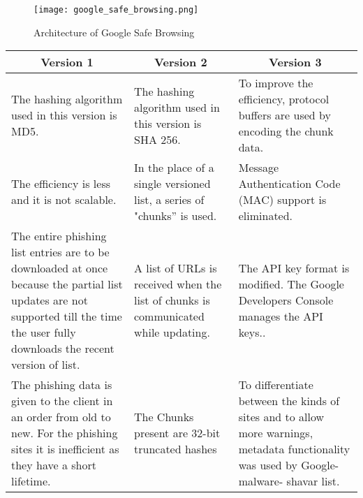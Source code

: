 \begin{figure}[t]
	\centering
	\texttt{[image: google\_safe\_browsing.png]}
	\caption{
		Architecture of Google Safe Browsing
		\citep{Priyam_Sandhu}}
	\label{fig:GSB_ARCHITECTURE}
\end{figure}

\begin{singlespace}
	\begin{table}[!b]
		\begin{center}
			\begin{tabular}{  m{11.9em}  m{11.9em}  m{11.9em}  } \toprule

				\multicolumn{1}{c}{\textbf{Version 1}}  &
				\multicolumn{1}{c}{\textbf{Version 2} } &
				\multicolumn{1}{c}{\textbf{Version 3}}                                                                                              \\ \midrule

				The hashing algorithm used in this
				version is MD5.                         & The hashing algorithm used in this
				version is SHA 256.                     & To improve the efficiency, protocol buffers are
				used by encoding the chunk data.\newline                                                                                            \\

				The efficiency is less and it is not
				scalable. \newline                      & In the place of a single versioned
				list, a series of "chunks” is used.     & Message Authentication Code (MAC) support
				is eliminated.                                                                                                                      \\

				The entire phishing list entries are to be
				downloaded at once because the
				partial list updates are not supported
				till the time the user fully downloads
				the recent version of list. \newline    & A list of URLs is received when the
				list of chunks is communicated
				while updating.                         & The API key format is modified. The Google
				Developers Console manages the API keys..                                                                                           \\

				The phishing data is given to the client in
				an order from old to new. For the
				phishing sites it is inefficient as they
				have a short lifetime.                  & The Chunks present are 32-bit
				truncated hashes                        & To differentiate between the kinds of sites and
				to allow more warnings, metadata
				functionality was used by Google-malware-
				shavar list.                                                                                                                        \\


\end{tabular}
\end{center}
\end{table}
\end{singlespace}
